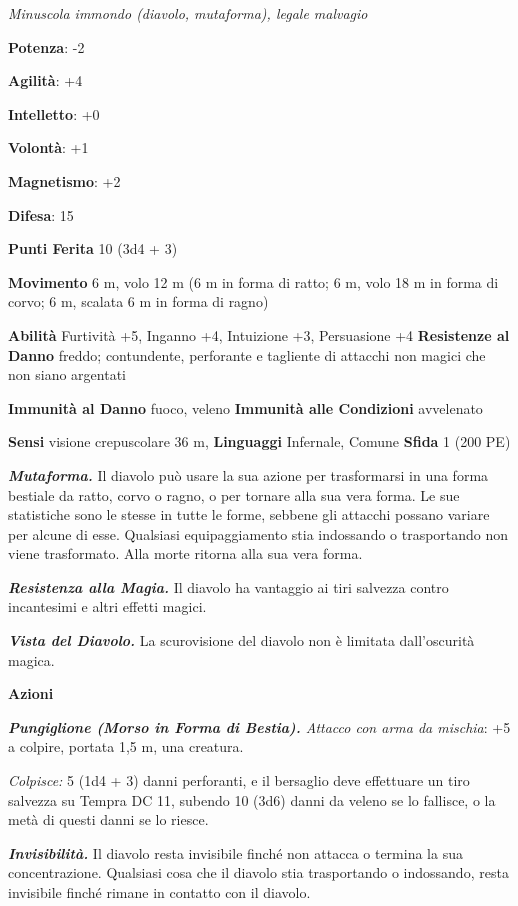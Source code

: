 \begin{multicols}{2}
\emph{Minuscola immondo (diavolo, mutaforma), legale malvagio}

\textbf{Potenza}: -2

\textbf{Agilità}: +4

\textbf{Intelletto}: +0

\textbf{Volontà}: +1

\textbf{Magnetismo}: +2

\textbf{Difesa}: 15

\textbf{Punti Ferita} 10 (3d4 + 3)

\textbf{Movimento} 6 m, volo 12 m (6 m in forma di ratto; 6 m, volo 18 m
in forma di corvo; 6 m, scalata 6 m in forma di ragno)

\textbf{Abilità} Furtività +5, Inganno +4, Intuizione +3, Persuasione +4
\textbf{Resistenze al Danno} freddo; contundente, perforante e tagliente
di attacchi non magici che non siano argentati

\textbf{Immunità al Danno} fuoco, veleno \textbf{Immunità alle
Condizioni} avvelenato

\textbf{Sensi} visione crepuscolare 36 m, 
\textbf{Linguaggi} Infernale, Comune \textbf{Sfida} 1 (200 PE)

\emph{\textbf{Mutaforma.}} Il diavolo può usare la sua azione per
trasformarsi in una forma bestiale da ratto, corvo o ragno, o per
tornare alla sua vera forma. Le sue statistiche sono le stesse in tutte
le forme, sebbene gli attacchi possano variare per alcune di esse.
Qualsiasi equipaggiamento stia indossando o trasportando non viene
trasformato. Alla morte ritorna alla sua vera forma.

\emph{\textbf{Resistenza alla Magia.}} Il diavolo ha vantaggio ai tiri
salvezza contro incantesimi e altri effetti magici.

\emph{\textbf{Vista del Diavolo.}} La scurovisione del diavolo non è
limitata dall'oscurità magica.

\textbf{Azioni}

\emph{\textbf{Pungiglione (Morso in Forma di Bestia).} Attacco con arma
da mischia}: +5 a colpire, portata 1,5 m, una creatura.

\emph{Colpisce:} 5 (1d4 + 3) danni perforanti, e il bersaglio deve
effettuare un tiro salvezza su Tempra DC 11, subendo 10 (3d6)
danni da veleno se lo fallisce, o la metà di questi danni se lo riesce.

\emph{\textbf{Invisibilità.}} Il diavolo resta invisibile finché non
attacca o termina la sua concentrazione. Qualsiasi cosa che il diavolo
stia trasportando o indossando, resta invisibile finché rimane in
contatto con il diavolo.


\end{multicols}
